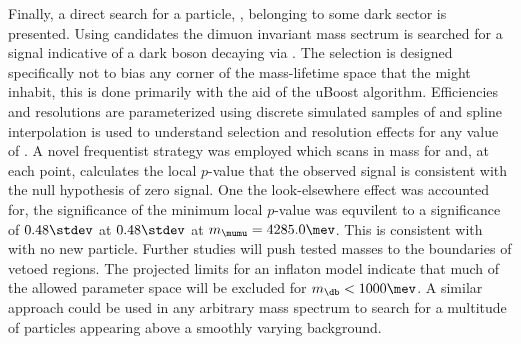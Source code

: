 


%
%
%
%


Finally, a direct search for a \np particle, \db, belonging to some dark sector is presented.
Using
\btokstrmumu candidates the dimuon invariant mass sectrum is searched for a signal indicative of a
dark boson decaying via \dbtomumu.
The selection is designed specifically not to bias any corner of the mass-lifetime space that the
\db might inhabit, this is done primarily with the aid of the uBoost algorithm.
Efficiencies and resolutions are parameterized using discrete simulated samples of \btokstrdb
and spline interpolation is used to understand selection and resolution effects for any value of
\mass{\db}.
A novel frequentist strategy was employed which scans in mass for and, at each point, calculates
the local $p$-value that the observed signal is consistent with the null hypothesis of zero signal.
One the look-elsewhere effect was accounted for, the significance of the minimum local $p$-value
was equvilent to a significance of $0.48\stdev$ at
$0.48\stdev$ at $m_{\mumu}=4285.0\mev$.
This is consistent with with no new particle.
Further studies will push tested masses to the boundaries of vetoed regions.
The projected limits for an inflaton model indicate that much of the allowed parameter space will
be excluded for $m_\db<1000\mev$.
A similar approach could be used in any arbitrary mass spectrum to search for a multitude of
particles appearing above a smoothly varying background.



